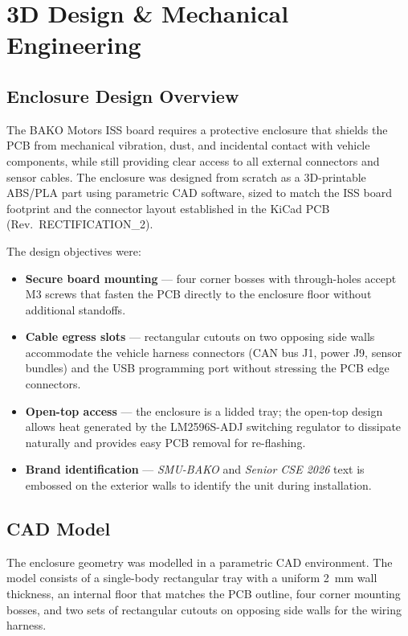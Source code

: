 \section{3D Design \& Mechanical Engineering}

\subsection{Enclosure Design Overview}

The BAKO Motors ISS board requires a protective enclosure that shields the PCB from mechanical vibration, dust, and incidental contact with vehicle components, while still providing clear access to all external connectors and sensor cables. The enclosure was designed from scratch as a 3D-printable ABS/PLA part using parametric CAD software, sized to match the ISS board footprint and the connector layout established in the KiCad PCB (Rev.~RECTIFICATION\_2).

The design objectives were:
\begin{itemize}
    \item \textbf{Secure board mounting} — four corner bosses with through-holes accept M3 screws that fasten the PCB directly to the enclosure floor without additional standoffs.
    \item \textbf{Cable egress slots} — rectangular cutouts on two opposing side walls accommodate the vehicle harness connectors (CAN bus J1, power J9, sensor bundles) and the USB programming port without stressing the PCB edge connectors.
    \item \textbf{Open-top access} — the enclosure is a lidded tray; the open-top design allows heat generated by the LM2596S-ADJ switching regulator to dissipate naturally and provides easy PCB removal for re-flashing.
    \item \textbf{Brand identification} --- \textit{SMU-BAKO} and \textit{Senior CSE 2026} text is embossed on the exterior walls to identify the unit during installation.
\end{itemize}

\subsection{CAD Model}

The enclosure geometry was modelled in a parametric CAD environment. The model consists of a single-body rectangular tray with a uniform 2~mm wall thickness, an internal floor that matches the PCB outline, four corner mounting bosses, and two sets of rectangular cutouts on opposing side walls for the wiring harness.

